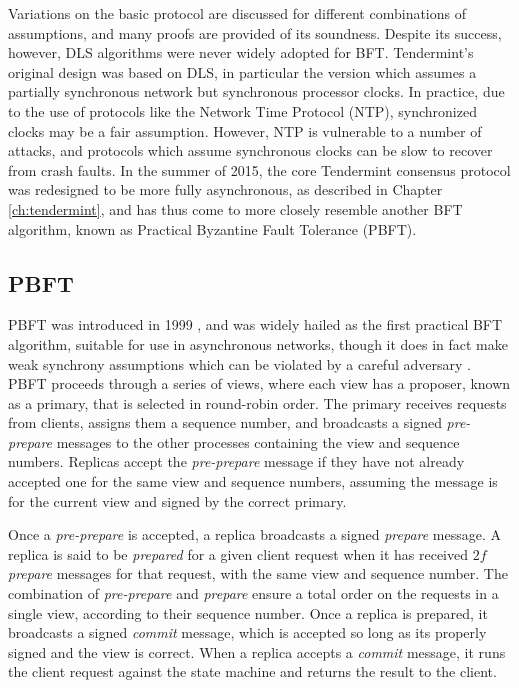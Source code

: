 Variations on the basic protocol are discussed for different combinations of assumptions,
and many proofs are provided of its soundness.
Despite its success, however, DLS algorithms were never widely adopted for BFT.
Tendermint's original design was based on DLS, in particular the version which assumes
a partially synchronous network but synchronous processor clocks.
In practice, due to the use of protocols like the Network Time Protocol (NTP), 
synchronized clocks may be a fair assumption.
However, NTP is vulnerable to a number of attacks,
and protocols which assume synchronous clocks can be slow to recover from crash faults.
In the summer of 2015, the core Tendermint consensus protocol was redesigned to be more fully asynchronous,
as described in Chapter \ref{ch:tendermint},
and has thus come to more closely resemble another BFT algorithm,
known as Practical Byzantine Fault Tolerance (PBFT).

\subsection{PBFT}

PBFT was introduced in 1999 \cite{pbft}, and was widely hailed as the first practical BFT algorithm,
suitable for use in asynchronous networks,
though it does in fact make weak synchrony assumptions which can be violated by a careful adversary \cite{honeybadger}.
PBFT proceeds through a series of views, 
where each view has a proposer, known as a primary,
that is selected in round-robin order.
The primary receives requests from clients,
assigns them a sequence number, and broadcasts a signed \emph{pre-prepare}
messages to the other processes containing the view and sequence numbers.
Replicas accept the \emph{pre-prepare} message if they have not already accepted one for the same
view and sequence numbers, assuming the message is for the current view and signed by the correct primary.

Once a \emph{pre-prepare} is accepted, a replica broadcasts a signed \emph{prepare} message.
A replica is said to be \emph{prepared} for a given client request when it has received $2f$ \emph{prepare}
messages for that request, with the same view and sequence number.
The combination of \emph{pre-prepare} and \emph{prepare} ensure a total order on the requests in a single view,
according to their sequence number. 
Once a replica is prepared, it broadcasts a signed \emph{commit} message,
which is accepted so long as its properly signed and the view is correct.
When a replica accepts a \emph{commit} message, it runs the client request against the state machine and returns the result to the client.

